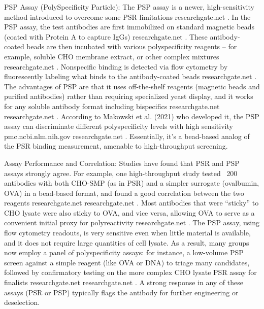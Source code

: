 PSP Assay (PolySpecificity Particle): The PSP assay is a newer, high-sensitivity method introduced to overcome some PSR limitations
researchgate.net
. In the PSP assay, the test antibodies are first immobilized on standard magnetic beads (coated with Protein A to capture IgGs)
researchgate.net
. These antibody-coated beads are then incubated with various polyspecificity reagents – for example, soluble CHO membrane extract, or other complex mixtures
researchgate.net
. Nonspecific binding is detected via flow cytometry by fluorescently labeling what binds to the antibody-coated beads
researchgate.net
. The advantages of PSP are that it uses off-the-shelf reagents (magnetic beads and purified antibodies) rather than requiring specialized yeast display, and it works for any soluble antibody format including bispecifics
researchgate.net
researchgate.net
. According to Makowski et al. (2021) who developed it, the PSP assay can discriminate different polyspecificity levels with high sensitivity
pmc.ncbi.nlm.nih.gov
researchgate.net
. Essentially, it’s a bead-based analog of the PSR binding measurement, amenable to high-throughput screening.

Assay Performance and Correlation: Studies have found that PSR and PSP assays strongly agree. For example, one high-throughput study tested ~200 antibodies with both CHO-SMP (as in PSR) and a simpler surrogate (ovalbumin, OVA) in a bead-based format, and found a good correlation between the two reagents
researchgate.net
researchgate.net
. Most antibodies that were “sticky” to CHO lysate were also sticky to OVA, and vice versa, allowing OVA to serve as a convenient initial proxy for polyreactivity
researchgate.net
. The PSP assay, using flow cytometry readouts, is very sensitive even when little material is available, and it does not require large quantities of cell lysate. As a result, many groups now employ a panel of polyspecificity assays: for instance, a low-volume PSP screen against a simple reagent (like OVA or DNA) to triage many candidates, followed by confirmatory testing on the more complex CHO lysate PSR assay for finalists
researchgate.net
researchgate.net
. A strong response in any of these assays (PSR or PSP) typically flags the antibody for further engineering or deselection.

